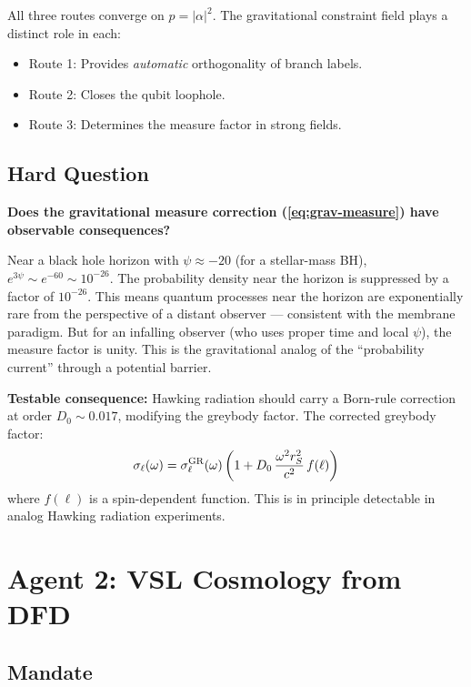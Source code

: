 \documentclass[11pt,a4paper]{article}
\begin{document}
All three routes converge on $p = |\alpha|^2$. The gravitational constraint field plays a distinct role in each:
\begin{itemize}
\item Route 1: Provides \emph{automatic} orthogonality of branch labels.
\item Route 2: Closes the qubit loophole.
\item Route 3: Determines the measure factor in strong fields.
\end{itemize}

\subsection{Hard Question}

\textbf{Does the gravitational measure correction (\ref{eq:grav-measure}) have observable consequences?}

Near a black hole horizon with $\psi \approx -20$ (for a stellar-mass BH), $e^{3\psi} \sim e^{-60} \sim 10^{-26}$. The probability density near the horizon is suppressed by a factor of $10^{-26}$. This means quantum processes near the horizon are exponentially rare from the perspective of a distant observer --- consistent with the membrane paradigm. But for an infalling observer (who uses proper time and local $\psi$), the measure factor is unity. This is the gravitational analog of the ``probability current'' through a potential barrier.

\textbf{Testable consequence:} Hawking radiation should carry a Born-rule correction at order $D_0 \sim 0.017$, modifying the greybody factor. The corrected greybody factor:
\begin{equation}
\sigma_\ell(\omega) = \sigma_\ell^{\rm GR}(\omega)\left(1 + D_0\,\frac{\omega^2 r_S^2}{c^2}\,f(\ell)\right)
\end{equation}
where $f(\ell)$ is a spin-dependent function. This is in principle detectable in analog Hawking radiation experiments.

\newpage
\section{Agent 2: VSL Cosmology from DFD}
\label{sec:agent2}

\subsection{Mandate}
\end{document}
